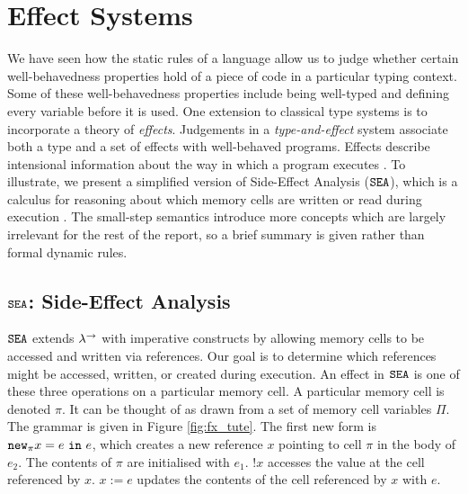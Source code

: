 \section{Effect Systems}

We have seen how the static rules of a language allow us to judge whether certain well-behavedness properties hold of a piece of code in a particular typing context. Some of these well-behavedness properties include being well-typed and defining every variable before it is used. One extension to classical type systems is to incorporate a theory of \textit{effects}. Judgements in a \textit{type-and-effect} system associate both a type and a set of effects with well-behaved programs. Effects describe intensional information about the way in which a program executes \cite{nielson99}. To illustrate, we present a simplified version of Side-Effect Analysis ($\mathtt{SEA}$), which is a calculus for reasoning about which memory cells are written or read during execution \cite{nielson99}. The small-step semantics introduce more concepts which are largely irrelevant for the rest of the report, so a brief summary is given rather than formal dynamic rules.

\subsection{$\mathtt{SEA}$: Side-Effect Analysis}

$\mathtt{SEA}$ extends $\lambda^{\rightarrow}$ with imperative constructs by allowing memory cells to be accessed and written via references. Our goal is to determine which references might be accessed, written, or created during execution. An effect in $\mathtt{SEA}$ is one of these three operations on a particular memory cell. A particular memory cell is denoted $\pi$. It can be thought of as drawn from a set of memory cell variables $\Pi$. The grammar is given in Figure \ref{fig:fx_tute}. The first new form is $\mathtt{new}_{\pi} x = e~\mathtt{in}~ e$, which creates a new reference $x$ pointing to cell $\pi$ in the body of $e_2$. The contents of $\pi$ are initialised with $e_1$. $!x$ accesses the value at the cell referenced by $x$. $x := e$ updates the contents of the cell referenced by $x$ with $e$.

